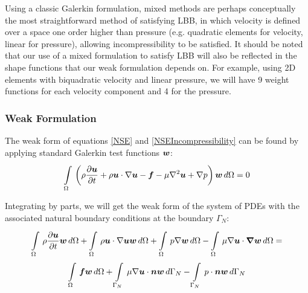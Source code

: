 Using a classic Galerkin formulation, mixed methods are perhaps conceptually the most straightforward method of satisfying LBB, in which velocity is defined over a space one order higher than pressure (e.g. quadratic elements for velocity, linear for pressure), allowing incompressibility to be satisfied. It should be noted that our use of a mixed formulation to satisfy LBB will also be reflected in the shape functions that our weak formulation depends on. For example, using 2D elements with biquadratic velocity and linear pressure, we will have 9 weight functions for each velocity component and 4 for the pressure. 

\subsubsection{Weak Formulation}
The weak form of equations \eqref{NSE} and \eqref{NSEIncompressibility} can be found by applying standard Galerkin test functions $\vect{w}$:
\begin{equation}
 \label{BasicGalerkinNSE}
  \gint{\Omega}{}{\pbrac{\rho\delby{\vect{u}}{t}
    +\rho\vect{u}\cdot\grad{\vect{u}}
    -\vect{f}
    -\mu\laplacian{\vect{u}}
    +\grad{p}}{\vect{w}}}{\Omega} = 0
\end{equation}

Integrating by parts, we will get the weak form of the system of PDEs with the associated natural boundary conditions at the boundary $\Gamma_N$:
\begin{multline}
 \label{GalerkinNSE}
  \gint{\Omega}{}{\rho\delby{\vect{u}}{t}{\vect{w}}}{\Omega}
 +\gint{\Omega}{}{\rho\vect{u}\cdot\grad\vect{u}{\vect{w}}}{\Omega}
 +\gint{\Omega}{}{p\grad{\vect{w}}}{\Omega}
 -\gint{\Omega}{}{\mu\grad{\vect{u}}\cdot\vect{\grad{w}}}{\Omega}=\\
 \gint{\Omega}{}{\vect{f}\vect{w}}{\Omega}
 +\gint{\Gamma_N}{}{\mu\dotprod{\grad\vect{u}}{\vect{n}}\vect{w}}{\Gamma_N}
 -\gint{\Gamma_N}{}{\dotprod{p}{\vect{n}}\vect{w}}{\Gamma_N}
\end{multline}

